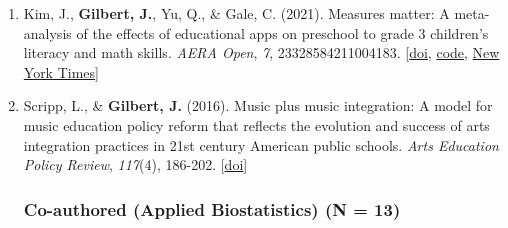 \documentclass[11pt]{article}
\begin{document}
\begin{enumerate}
\item Kim, J., \textbf{Gilbert, J.}, Yu, Q., \& Gale, C. (2021). Measures matter: A meta-analysis of the effects of educational apps on preschool to grade 3 children’s literacy and math skills. \textit{AERA Open}, \textit{7}, 23328584211004183. [\href{https://journals.sagepub.com/doi/pdf/10.1177/23328584211004183}{doi}, \href{https://dataverse.harvard.edu/dataset.xhtml?persistentId=doi:10.7910/DVN/V17T2Y}{code}, \href{https://www.nytimes.com/2024/04/17/opinion/educational-technology.html}{New York Times}] \label{app_meta}
\item Scripp, L., \& \textbf{Gilbert, J.} (2016). Music plus music integration: A model for music education policy reform that reflects the evolution and success of arts integration practices in 21st century American public schools. \textit{Arts Education Policy Review}, \textit{117}(4), 186-202. [\href{https://www.tandfonline.com/doi/pdf/10.1080/10632913.2016.1211923?casa_token=Fm8q4coas4QAAAAA:E6YodjckmZmQkDolznV3o3q7sYDuoMgI1243nCxHDS2LHG6m3cF5kGRtUGqpwvGWJvc0-9my84Lq}{doi}]

\subsubsection{Co-authored (Applied Biostatistics) (N = 13)}


\end{enumerate}
\end{document}

